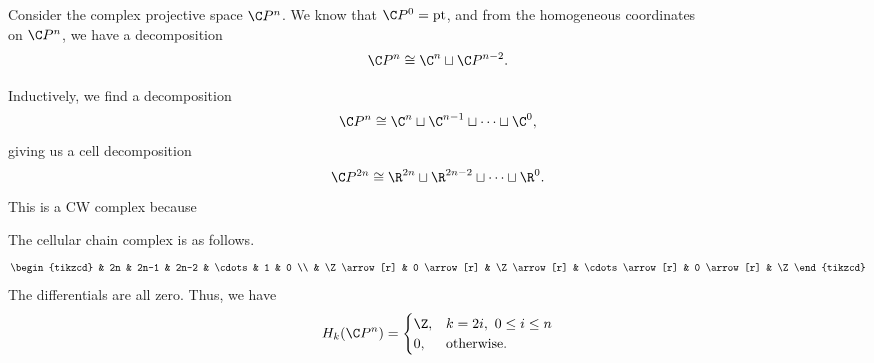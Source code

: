 \documentclass[main.tex]{subfiles}
\begin{document}
\begin{example}
  \label{eg:homology_of_complex_projective_space}
  Consider the complex projective space $\C P^{n}$. We know that $\C P^{0} = \mathrm{pt}$, and from the homogeneous coordinates
  \begin{equation*}
    [x_{0} : \cdots | x_{n}]
  \end{equation*}
  on $\C P^{n}$, we have a decomposition
  \begin{equation*}
    \C P^{n} \cong \C^{n} \sqcup \C P^{n-2}.
  \end{equation*}

  Inductively, we find a decomposition
  \begin{equation*}
    \C P^{n} \cong \C^{n} \sqcup \C^{n-1} \sqcup \cdots \sqcup \C^{0},
  \end{equation*}
  giving us a cell decomposition
  \begin{equation*}
    \C P^{2n} \cong \R^{2n} \sqcup \R^{2n-2} \sqcup \cdots \sqcup \R^{0}.
  \end{equation*}
  This is a CW complex because

  The cellular chain complex is as follows.
  \begin{equation*}
    \begin{tikzcd}
      & 2n
      & 2n-1
      & 2n-2
      & \cdots
      & 1
      & 0
      \\
      & \Z
      \arrow[r]
      & 0
      \arrow[r]
      & \Z
      \arrow[r]
      & \cdots
      \arrow[r]
      & 0
      \arrow[r]
      & \Z
    \end{tikzcd}
  \end{equation*}
  The differentials are all zero. Thus, we have
  \begin{equation*}
    H_{k}(\C P^{n}) =
    \begin{cases}
      \Z, &k = 2i,\ 0 \leq i \leq n \\
      0, & \text{otherwise}.
    \end{cases}
  \end{equation*}
\end{example}
\end{document}
